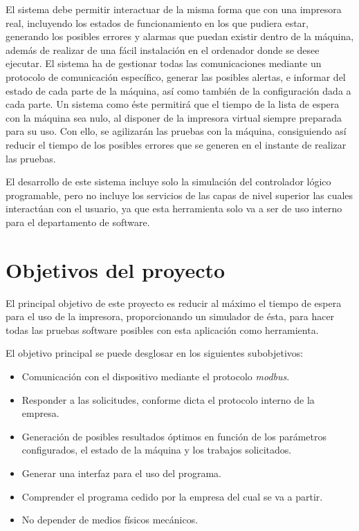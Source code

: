 \documentclass[pdftex,11pt,a4paper]{book}
\begin{document}
El sistema debe permitir interactuar de la misma forma que con una impresora real, incluyendo los estados de funcionamiento en los que pudiera estar, generando los posibles errores y alarmas que puedan existir dentro de la máquina, además de realizar de una fácil instalación en el ordenador donde se desee ejecutar. El sistema ha de gestionar todas las comunicaciones mediante un protocolo de comunicación específico, generar las posibles alertas, e informar del estado de cada parte de la máquina, así como también de la configuración dada a cada parte. Un sistema como éste permitirá que el tiempo de la lista de espera con la máquina sea nulo, al disponer de la impresora virtual siempre preparada para su uso. Con ello, se agilizarán las pruebas con la máquina, consiguiendo así reducir el tiempo de los posibles errores que se generen en el instante de realizar las pruebas.

El desarrollo de este sistema incluye solo la simulación del controlador lógico programable, pero no incluye los servicios de las capas de nivel superior las cuales interactúan con el usuario, ya que esta herramienta solo va a ser de uso interno para el departamento de software.

\section{Objetivos del proyecto}
El principal objetivo de este proyecto es reducir al máximo el tiempo de espera para el uso de la impresora, proporcionando un simulador de ésta, para hacer todas las pruebas software posibles con esta aplicación como herramienta.

El objetivo principal se puede desglosar en los siguientes subobjetivos:
\begin{itemize}
\item Comunicación con el dispositivo mediante el protocolo \emph{modbus}.
\item Responder a las solicitudes, conforme dicta el protocolo interno de la empresa.
\item Generación de posibles resultados óptimos en función de los parámetros configurados, el estado de la máquina y los trabajos solicitados.
\item Generar una interfaz para el uso del programa.
\item Comprender el programa cedido por la empresa del cual se va a partir.
\item No depender de medios físicos mecánicos.
\end{itemize}
\end{document}
